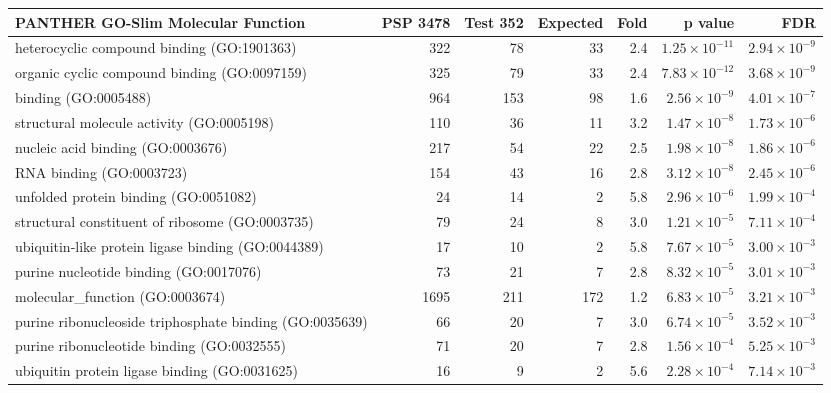 \begin{table}[ht]
\centering
\begin{adjustbox}{width=\textwidth}
\begin{tabular}{lrrrrrr}
  \hline
PANTHER GO-Slim Molecular Function & PSP 3478 & Test 352 & Expected & Fold & p value & FDR \\ 
  \hline
heterocyclic compound binding (GO:1901363) & 322 & 78 & 33 & 2.4 & $1.25 \times 10^{-11}$ & $2.94 \times 10^{-9}$ \\ 
  organic cyclic compound binding (GO:0097159) & 325 & 79 & 33 & 2.4 & $7.83 \times 10^{-12}$ & $3.68 \times 10^{-9}$ \\ 
  binding (GO:0005488) & 964 & 153 & 98 & 1.6 & $2.56 \times 10^{-9}$ & $4.01 \times 10^{-7}$ \\ 
  structural molecule activity (GO:0005198) & 110 & 36 & 11 & 3.2 & $1.47 \times 10^{-8}$ & $1.73 \times 10^{-6}$ \\ 
  nucleic acid binding (GO:0003676) & 217 & 54 & 22 & 2.5 & $1.98 \times 10^{-8}$ & $1.86 \times 10^{-6}$ \\ 
  RNA binding (GO:0003723) & 154 & 43 & 16 & 2.8 & $3.12 \times 10^{-8}$ & $2.45 \times 10^{-6}$ \\ 
  unfolded protein binding (GO:0051082) & 24 & 14 & 2 & 5.8 & $2.96 \times 10^{-6}$ & $1.99 \times 10^{-4}$ \\ 
  structural constituent of ribosome (GO:0003735) & 79 & 24 & 8 & 3.0 & $1.21 \times 10^{-5}$ & $7.11 \times 10^{-4}$ \\ 
  ubiquitin-like protein ligase binding (GO:0044389) & 17 & 10 & 2 & 5.8 & $7.67 \times 10^{-5}$ & $3.00 \times 10^{-3}$ \\ 
  purine nucleotide binding (GO:0017076) & 73 & 21 & 7 & 2.8 & $8.32 \times 10^{-5}$ & $3.01 \times 10^{-3}$ \\ 
  molecular\_function (GO:0003674) & 1695 & 211 & 172 & 1.2 & $6.83 \times 10^{-5}$ & $3.21 \times 10^{-3}$ \\ 
  purine ribonucleoside triphosphate binding (GO:0035639) & 66 & 20 & 7 & 3.0 & $6.74 \times 10^{-5}$ & $3.52 \times 10^{-3}$ \\ 
  purine ribonucleotide binding (GO:0032555) & 71 & 20 & 7 & 2.8 & $1.56 \times 10^{-4}$ & $5.25 \times 10^{-3}$ \\ 
  ubiquitin protein ligase binding (GO:0031625) & 16 & 9 & 2 & 5.6 & $2.28 \times 10^{-4}$ & $7.14 \times 10^{-3}$ \\ 

\end{tabular}
\end{adjustbox}
\end{table}
